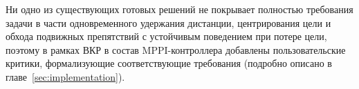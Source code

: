 Ни одно из существующих готовых решений не покрывает полностью
требования задачи в части одновременного удержания дистанции,
центрирования цели и обхода подвижных препятствий с устойчивым
поведением при потере цели, поэтому в рамках ВКР в состав MPPI-контроллера
добавлены пользовательские критики, формализующие соответствующие
требования (подробно описано в главе~\ref{sec:implementation}).
